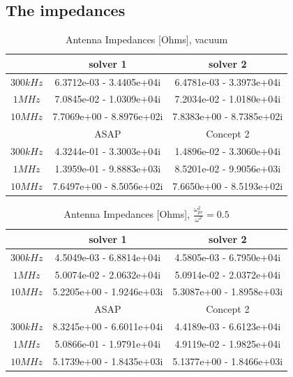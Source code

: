 \documentclass[a4paper,11pt]{article}
\begin{document}
\subsection{The impedances}
\begin{table}
\begin{center}
\caption{Antenna Impedances [Ohms], vacuum}
\label{tab:impedances_vacuum}
\begin{tabular}{|c|c|c|}
 \hline
 & solver 1  & solver 2  \\
\hline
$300 kHz$ & 6.3712e-03 - 3.4405e+04i &  6.4781e-03 - 3.3973e+04i \\
$1 MHz$ & 7.0845e-02 - 1.0309e+04i &  7.2034e-02 - 1.0180e+04i \\
$10 MHz$ &  7.7069e+00 - 8.8976e+02i&  7.8383e+00 - 8.7385e+02i\\
\hline
& ASAP  & Concept 2\\
\hline
$300 kHz$ &  4.3244e-01 - 3.3003e+04i &  1.4896e-02 - 3.3060e+04i\\
$1 MHz$ & 1.3959e-01 - 9.8883e+03i &  8.5201e-02 - 9.9056e+03i\\
$10 MHz$ &    7.6497e+00 - 8.5056e+02i&  7.6650e+00 - 8.5193e+02i\\
\hline
\end{tabular}
\end{center}
\end{table}




\begin{table}
\begin{center}
\caption{Antenna Impedances [Ohms], $\frac{\omega_{pe}^2}{\omega^2}=0.5$}
\label{tab:impedances_plasma}
\begin{tabular}{|c|c|c|}
 \hline
 & solver 1  & solver 2  \\
\hline
$300 kHz$ & 4.5049e-03 - 6.8814e+04i & 4.5805e-03 - 6.7950e+04i  \\
$1 MHz$ &  5.0074e-02 - 2.0632e+04i &  5.0914e-02 - 2.0372e+04i \\
$10 MHz$ & 5.2205e+00 - 1.9246e+03i &  5.3087e+00 - 1.8958e+03i \\
\hline
& ASAP  & Concept 2  \\
\hline
$300 kHz$ & 8.3245e+00 - 6.6011e+04i &  4.4189e-03 - 6.6123e+04i \\
$1 MHz$ & 5.0866e-01 - 1.9791e+04i &  4.9119e-02 - 1.9825e+04i \\
$10 MHz$ &  5.1739e+00 - 1.8435e+03i&  5.1377e+00 - 1.8466e+03i \\
\hline
\end{tabular}
\end{center}
\end{table}
\end{document}
